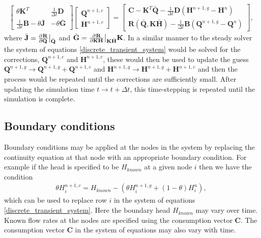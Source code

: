 \begin{align}\label{discrete_transient_system}
\begin{bmatrix}
\theta \mathbf{K}^T & \frac{1}{\Delta t}\mathbf{D} \\
\frac{1}{\Delta t}\mathbf{B}-\theta \bar{\mathbf{J}} & - \theta \bar{\mathbf{G}}
\end{bmatrix} 
\begin{bmatrix}
\mathbf{Q}^{n+1,c} \\ \mathbf{H}^{n+1,c}
\end{bmatrix} = \begin{bmatrix}
\mathbf{C} - \mathbf{K}^T \bar{\mathbf{Q}} - \frac{1}{\Delta t} \mathbf{D} \left( \mathbf{H}^{n+1,g} - \mathbf{H}^{n} \right) \\
\mathbf{R}\left(\bar{\mathbf{Q}}, \mathbf{K} \bar{\mathbf{H}} \right) - \frac{1}{\Delta t} \mathbf{B} \left(\mathbf{Q}^{n+1,g} - \mathbf{Q}^{n} \right)
\end{bmatrix},
\end{align}
where $\bar{\mathbf{J}} = \frac{\partial^{} \mathbf{R}}{\partial \mathbf{Q}^{}} \big\vert_{\bar{\mathbf{Q}}}$ and $\bar{\mathbf{G}} = \frac{\partial^{} \mathbf{R}}{\partial \mathbf{K} \mathbf{H}^{}} \big\vert_{\mathbf{K} \bar{\mathbf{H}}} \mathbf{K} $. In a similar manner to the steady solver the system of equations \eqref{discrete_transient_system} would be solved for the corrections, $\mathbf{Q}^{n+1,c}$ and $\mathbf{H}^{n+1,c}$, these would then be used to update the guess $\mathbf{Q}^{n+1,g} \rightarrow \mathbf{Q}^{n+1,g} + \mathbf{Q}^{n+1,c} $ and $\mathbf{H}^{n+1,g} \rightarrow \mathbf{H}^{n+1,g} + \mathbf{H}^{n+1,c} $ and then the process would be repeated until the corrections are sufficiently small. After updating the simulation time $t \rightarrow t + \Delta t$, this time-stepping is repeated until the simulation is complete.   

\subsection{Boundary conditions}

Boundary conditions may be applied at the nodes in the system by replacing the continuity equation at that node with an appropriate boundary condition. For example if the head is specified to be $H_{known}$ at a given node $i$ then we have the condition 
\begin{align}
\theta H_i^{n+1,c} = H_{known} - \left( \theta H_i^{n+1,g} + (1-\theta)H_i^n \right),
\end{align} 
which can be used to replace row $i$ in the system of equations \eqref{discrete_transient_system}. Here the boundary head $H_{known}$ may vary over time. Known flow rates at the nodes are specified using the consumption vector $\mathbf{C}$. The consumption vector $\mathbf{C}$ in the system of equations may also vary with time. 

